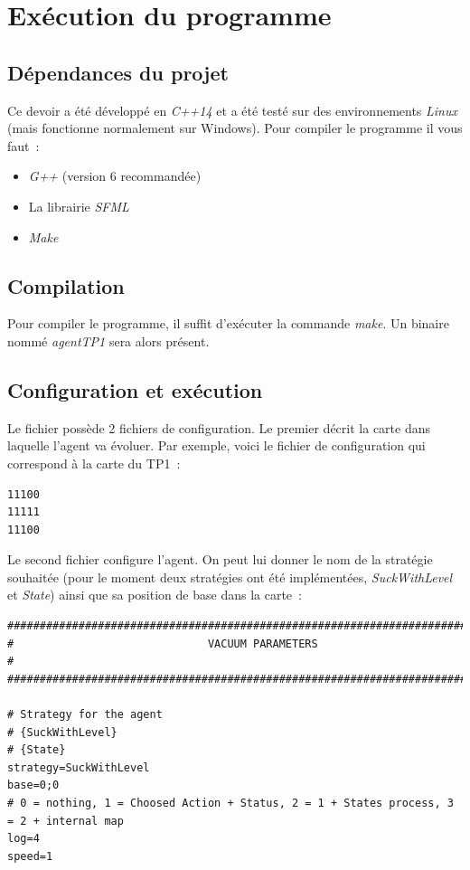 \documentclass{article}
\begin{document}
\section{Exécution du programme}
\subsection{Dépendances du projet}
Ce devoir a été développé en \emph{C++14} et a été testé sur des environnements \emph{Linux} (mais fonctionne normalement sur Windows). Pour compiler le programme il vous faut~:
\begin{itemize}
    \item \emph{G++} (version 6 recommandée)
    \item La librairie \emph{SFML}
    \item \emph{Make}
\end{itemize}
\subsection{Compilation}
Pour compiler le programme, il suffit d'exécuter la commande \emph{make}. Un binaire nommé \emph{agentTP1} sera alors présent.
\subsection{Configuration et exécution}
Le fichier possède 2 fichiers de configuration. Le premier décrit la carte dans laquelle l'agent va évoluer. Par exemple, voici le fichier de configuration qui correspond à la carte du TP1~:
\begin{verbatim}
11100
11111
11100
\end{verbatim}

Le second fichier configure l'agent. On peut lui donner le nom de la stratégie souhaitée (pour le moment deux stratégies ont été implémentées, \emph{SuckWithLevel} et \emph{State}) ainsi que sa position de base dans la carte~:

\begin{verbatim}
###############################################################################
#                              VACUUM PARAMETERS                              #
###############################################################################

# Strategy for the agent
# {SuckWithLevel}
# {State}
strategy=SuckWithLevel
base=0;0
# 0 = nothing, 1 = Choosed Action + Status, 2 = 1 + States process, 3 = 2 + internal map
log=4
speed=1
\end{verbatim}
\end{document}
